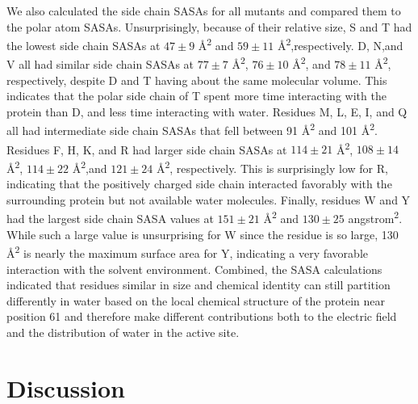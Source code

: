 We also calculated the side chain SASAs for all mutants and compared them to the polar atom SASAs. 
Unsurprisingly, because of their relative size, S and T had the lowest side chain SASAs at $47 \pm 9$ \si{\angstrom^2} and $59 \pm 11$ \si{\angstrom^2},respectively. 
D, N,and V all had similar side chain SASAs at $77 \pm 7$ \si{\angstrom^2}, $76 \pm 10$ \si{\angstrom^2}, and $78 \pm 11$ \si{\angstrom^2}, respectively, despite D and T having about the same molecular volume.
This indicates that the polar side chain of T spent more time interacting with the protein than D, and less time interacting with water. 
Residues M, L, E, I, and Q all had intermediate side chain SASAs that fell between 91 \si{\angstrom^2} and 101 \si{\angstrom^2}. 
Residues F, H, K, and R had larger side chain SASAs at $114 \pm 21$ \si{\angstrom^2}, $108 \pm 14$ \si{\angstrom^2}, $114 \pm 22$ \si{\angstrom^2},and $121 \pm 24$ \si{\angstrom^2}, respectively. 
This is surprisingly low for R, indicating that the positively charged side chain interacted favorably with the surrounding protein but not available water molecules.
Finally, residues W and Y had the largest side chain SASA values at $151 \pm 21$ \si{\angstrom^2} and $130 \pm 25$ \si{angstrom^2}. 
While such a large value is unsurprising for W since the residue is so large, 130 \si{\angstrom^2} is nearly the maximum surface area for Y, indicating a very favorable interaction with the solvent environment. 
Combined, the SASA calculations indicated that residues similar in size and chemical identity can still partition differently in water based on the local chemical structure of the protein near position 61 and therefore make different contributions both to the electric field and the distribution of water in the active site. 

\section{Discussion}\label{ras-discussion}

